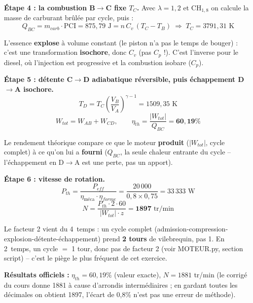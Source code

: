 \documentclass[11pt,a4paper]{article}
\begin{document}
\begin{calc}
\textbf{Étape 4 : la combustion B$\to$C fixe $T_C$.} Avec $\lambda=1{,}2$ et CH$_{1,8}$ on calcule
la masse de carburant brûlée par cycle, puis :
\[ Q_{BC} = m_{carb}\cdot\text{PCI} = 875{,}79\text{ J} = n\,C_v\,(T_C-T_B) \;\Rightarrow\; T_C=3791{,}31\text{ K} \]
\end{calc}
\begin{pourquoi}
L'essence \textbf{explose} à volume constant (le piston n'a pas le temps de bouger) : c'est une
transformation \textbf{isochore}, donc $C_v$ (pas $C_p$ !). C'est l'inverse pour le diesel, où
l'injection est progressive et la combustion isobare ($C_p$).
\end{pourquoi}

\begin{calc}
\textbf{Étape 5 : détente C$\to$D adiabatique réversible, puis échappement D$\to$A isochore.}
\[ T_D = T_C\left(\frac{V_B}{V_A}\right)^{\gamma-1} = 1509{,}35\text{ K} \]
\[ W_{tot} = W_{AB}+W_{CD},\qquad \eta_{th}=\frac{|W_{tot}|}{Q_{BC}} = \mathbf{60{,}19\%} \]
\end{calc}
\begin{pourquoi}
Le rendement théorique compare ce que le moteur \textbf{produit} ($|W_{tot}|$, cycle complet) à ce
qu'on lui a \textbf{fourni} ($Q_{BC}$, la seule chaleur entrante du cycle -- l'échappement en
D$\to$A est une perte, pas un apport).
\end{pourquoi}

\begin{calc}
\textbf{Étape 6 : vitesse de rotation.}
\[ P_{th} = \frac{P_{eff}}{\eta_{\text{méca}}\cdot\eta_{forme}} = \frac{20\,000}{0{,}8\times0{,}75}
=33\,333\text{ W} \]
\[ N = \frac{P_{th}\cdot2\cdot60}{|W_{tot}|\cdot z} = \mathbf{1897}\text{ tr/min} \]
\end{calc}
\begin{pourquoi}
Le facteur 2 vient du 4~temps : un cycle complet (admission-compression-explosion-détente-échappement)
prend \textbf{2 tours} de vilebrequin, pas 1. En 2~temps, un cycle $=$ 1 tour, donc pas de facteur 2
(voir MOTEUR.py, section script) -- c'est le piège le plus fréquent de cet exercice.
\end{pourquoi}

\begin{verif}
\textbf{Résultats officiels :} $\eta_{th}=60{,}19\%$ (valeur exacte), $N=1881$ tr/min (le corrigé
du cours donne 1881 à cause d'arrondis intermédiaires ; en gardant toutes les décimales on obtient
1897, l'écart de 0,8\% n'est pas une erreur de méthode).
\end{verif}
\end{document}
